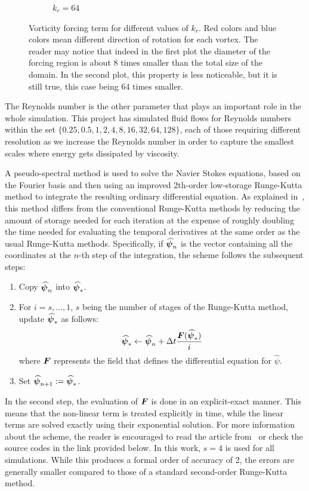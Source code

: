 \documentclass[../main.tex]{subfiles}
\begin{document}
\begin{figure}[ht]
\begin{subfigure}{0.44\textwidth}
		\caption{$k_r = 64$}
	\end{subfigure}
	\caption{Vorticity forcing term for different values of $k_r$. Red colors and blue colors mean different direction of rotation for each vortex. The reader may notice that indeed in the first plot the diameter of the forcing region is about 8 times smaller than the total size of the domain. In the second plot, this property is less noticeable, but it is still true, this case being 64 times smaller.}\label{fig:forcing}
\end{figure}

The Reynolds number is the other parameter that plays an important role in the whole simulation. This project has simulated fluid flows for Reynolds numbers within the set $\{0.25, 0.5, 1, 2, 4, 8, 16, 32, 64, 128\}$, each of those requiring different resolution as we increase the Reynolds number in order to capture the smallest scales where energy gets dissipated by viscosity.

A pseudo-spectral method is used to solve the Navier Stokes equations, based on the Fourier basis and then using an improved 2th-order low-storage Runge-Kutta method to integrate the resulting ordinary differential equation. As explained in~\cite{rungekutta}, this method differs from the conventional Runge-Kutta methods by reducing the amount of storage needed for each iteration at the expense of roughly doubling the time needed for evaluating the temporal derivatives at the same order as the usual Runge-Kutta methods. Specifically, if $\boldsymbol{\widehat{\psi}}_n$ is the vector containing all the coordinates at the $n$-th step of the integration, the scheme follows the subsequent steps:
\begin{enumerate}
	\item Copy $\boldsymbol{\widehat\psi}_n$ into $\boldsymbol{\widehat\psi}_*$.
	\item For $i = s, \ldots, 1$, $s$ being the number of stages of the Runge-Kutta method, update $\boldsymbol{\widehat\psi}_*$ as follows:
	      \begin{equation}
		      \boldsymbol{\widehat\psi}_* \leftarrow \boldsymbol{\widehat\psi}_n + \Delta t \frac{\boldsymbol{F}(\boldsymbol{\widehat\psi}_*)}{i}
	      \end{equation}
	      where $\boldsymbol{F}$ represents the field that defines the differential equation for ${\widehat\psi}$.
	\item Set $\boldsymbol{\widehat\psi}_{n+1} := \boldsymbol{\widehat\psi}_*$.
\end{enumerate}
In the second step, the evaluation of $\boldsymbol{F}$ is done in an explicit-exact manner. This means that the non-linear term is treated explicitly in time, while the linear terms are solved exactly using their exponential solution. For more information about the scheme, the reader is encouraged to read the article from~\cite{rungekutta} or check the source codes in the link provided below. In this work, $s=4$ is used for all simulations. While this produces a formal order of accuracy of 2, the errors are generally smaller compared to those of a standard second-order Runge-Kutta method.
\end{document}
